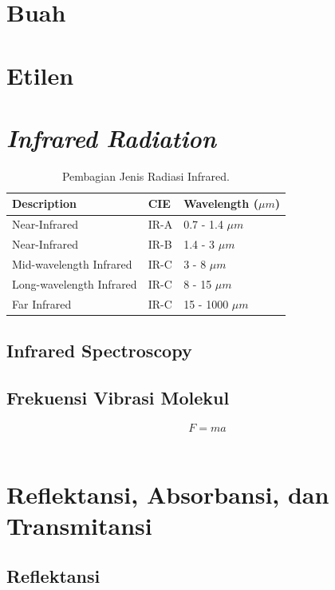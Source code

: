 \documentclass[12pt,a4paper]{report}
\begin{document}
	\section{Buah}
	
	\section{Etilen}
	
	\section{\textit{Infrared Radiation}}
	\begin{table}[!htbp]
		\small
		\centering
		\caption{Pembagian Jenis Radiasi Infrared.}
		\label{tabel1}
		\begin{tabular}{|p{5.0cm}|p{2cm}|p{3.5cm}|}
		\hline
		\textbf{Description }	& \textbf{CIE }	& \textbf{Wavelength ($\mu m$)} \\
		\hline
		Near-Infrared				& IR-A	& 0.7  - 1.4 $\mu m$\\
		Near-Infrared				& IR-B	& 1.4  - 3 $\mu m$ \\
		Mid-wavelength Infrared		& IR-C	& 3 - 8 $\mu m$ \\
		Long-wavelength Infrared	& IR-C	& 8 - 15 $\mu m$ \\
		Far Infrared				& IR-C	& 15 - 1000 $\mu m$ \\
		\hline
		\end{tabular}
	\end{table}
	\vspace{-0.5cm}
	\subsection{Infrared Spectroscopy}
			
	\subsection{Frekuensi Vibrasi Molekul}
	\begin{equation}
		F = ma
		\label{newton}
	\end{equation}\\
		
	\section{Reflektansi, Absorbansi, dan Transmitansi}
		
	\subsection{Reflektansi}
		
\end{document}
